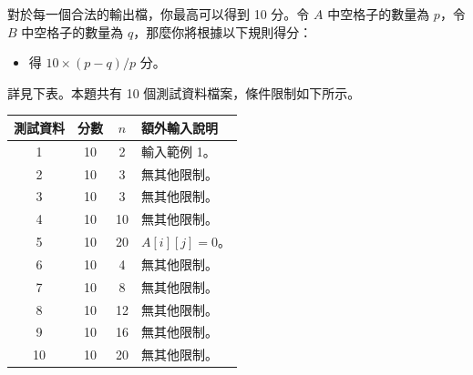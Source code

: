 對於每一個合法的輸出檔，你最高可以得到 10 分。令 $A$ 中空格子的數量為 $p$，令 $B$ 中空格子的數量為 $q$，那麼你將根據以下規則得分：

\begin{itemize}
    \item 得 $10\times (p-q)/p$ 分。
\end{itemize}

詳見下表。本題共有 10 個測試資料檔案，條件限制如下所示。
\begin{center}
    \begin{tabular}[t]{@{}cccl@{}}
    \toprule
    測試資料 & 分數 & $n$ & 額外輸入說明\\
    \midrule
    1 & 10 & 2 & 輸入範例 1。\\
    2 & 10 & 3 & 無其他限制。\\
    3 & 10 & 3 & 無其他限制。\\
    4 & 10 & 10 & 無其他限制。\\
    5 & 10 & 20 & $A[i][j]=0$。\\
    6 & 10 & 4 & 無其他限制。\\
    7 & 10 & 8 & 無其他限制。\\
    8 & 10 & 12 & 無其他限制。\\
    9 & 10 & 16 & 無其他限制。\\
    10 & 10 & 20 & 無其他限制。\\
    \bottomrule
    \end{tabular}
\end{center}



